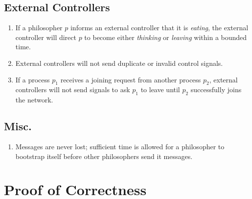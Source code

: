 \documentclass[11pt]{article}
\begin{document}
\subsection{External Controllers}
\begin{enumerate}[E1]
\item If a philosopher $p$ informs an external controller that it is \emph{eating}, the external controller will direct $p$ to become either \emph{thinking} or \emph{leaving} within a bounded time.

\item External controllers will not send duplicate or invalid control signals.

\item \label{Assump:E_guarantees_nodes_entering_network} If a process $p_1$ receives a joining request from another process $p_2$, external controllers will not send signals to ask $p_1$ to leave until $p_2$ successfully joins the network.
\end{enumerate}

\subsection{Misc.}
\begin{enumerate}[E4]
\item Messages are never lost; sufficient time is allowed for a philosopher to bootstrap itself before other philosophers send it messages.
\end{enumerate}


\section{Proof of Correctness}
\end{document}
